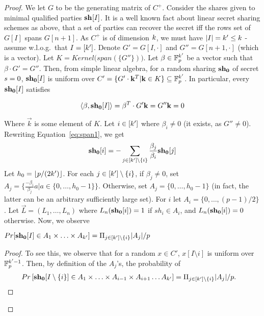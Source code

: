 \begin{proof}
We let $G$ to be the generating matrix of $C^+$. 
Consider the shares given to minimal qualified parties $\mathbf{sh_{}}[I]$. It is a well known fact about linear secret sharing schemes as above, that
a set of parties can recover the secret iff the rows set of $G[I]$ spans $G[n+1]$. 
As $C^+$ is of dimension $k$, we must have $|I|=k'\leq k$ - assume w.l.o.g.\ that $I=[k']$. Denote $G'=G[I,\cdot]$ and $G''=G[n+1,\cdot]$ (which is a vector). Let $K=Kernel\big(span(\{G''\})\big)$.
Let $\beta\in \mathbb{F}^{k'}_p$ be a vector such that $\beta\cdot G'=G''$. Then, from simple linear algebra, for a random sharing $\mathbf{sh_{0}}$ of secret $s = 0$,
$\mathbf{sh_{0}}[I]$ is uniform over $C'=\{G'\cdot \mathbf{k}^T|\mathbf{k}\in K\}\subseteq \mathbb{F}^{k'}_p$. 
In particular, every $\mathbf{sh_{0}}[I]$ satisfies

\begin{equation}\label{eq:span1}
\langle\beta,\mathbf{sh_{0}}[I]\rangle=\beta^T\cdot G'\mathbf{k}=G''\mathbf{k}=0
\end{equation}

Where $\Vec{k}$ is some element of $K$. Let $i\in [k']$ where $\beta_i\neq 0$ (it exists, as $G''\neq 0$).
Rewriting Equation~\ref{eq:span1}, we get
\begin{equation}\label{eq:span2}
\mathbf{sh_{0}}[i]=-\sum_{j\in [k']\setminus{\{i\}}}\frac{\beta_j}{\beta_i}\mathbf{sh_{0}}[j]
\end{equation}
Let $h_0=\lfloor p/(2k')\rfloor$. For each $j\in [k']\setminus{\{i\}}$, if $\beta_j\neq 0$, set $A_j=\{\frac{-\beta_i}{\beta_j}a|a\in\{0,\ldots,h_0-1\}\}$. 
Otherwise, set $A_j=\{0,\ldots,h_0-1\}$ (in fact, the latter can be an arbitrary sufficiently large set). For $i$ let $A_i=\{0,\ldots,(p-1)/2\}$.
Let $\vec{L}=(L_1,\ldots,L_n)$ where $L_n(\mathbf{sh_{0}}[i])=1$ if $sh_i\in A_i$, and $L_n(\mathbf{sh_{0}}[i])=0$ otherwise. 
Now, we observe
\begin{claim}\label{clm-ajprob}
$Pr[\mathbf{sh_{0}}[I]\in A_1\times \ldots\times A_{k'}]=\Pi_{j\in [k']\setminus{\{i\}}}|A_j|/p$
\end{claim}

\begin{proof}
To see this, we observe that for a random $x\in C'$, $x[I\setminus{i}]$ is uniform over $\mathbb{F}^{k'-1}_p$.
Then, by definition of the $A_j$'s, the probability of
\begin{align}
&Pr\left[ \mathbf{sh_{0}}[I\setminus\{i\}]\in A_1\times \ldots\times A_{i-1}\times A_{i+1}\ldots A_{k'} \right] = \Pi_{j\in [k']\setminus{\{i\}}}|A_j|/p \nonumber.
\end{align}


\end{proof}
\end{proof}
